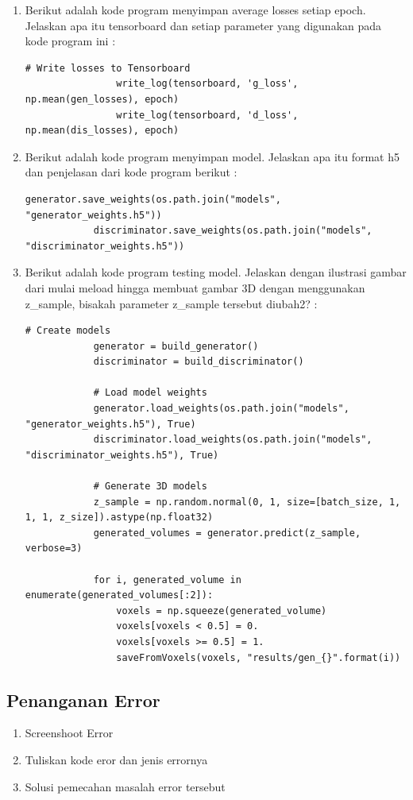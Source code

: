 \begin{enumerate}
    \item Berikut adalah kode program menyimpan average losses setiap epoch. Jelaskan apa itu tensorboard dan setiap parameter yang digunakan pada kode program ini :
    \begin{lstlisting}[caption=Simpan Average losses setiap epoch,label={lst:8.14}]
                # Write losses to Tensorboard
                write_log(tensorboard, 'g_loss', np.mean(gen_losses), epoch)
                write_log(tensorboard, 'd_loss', np.mean(dis_losses), epoch)
    \end{lstlisting}

    \item Berikut adalah kode program menyimpan model. Jelaskan apa itu format h5 dan penjelasan dari kode program berikut :
    \begin{lstlisting}[caption=Simpan model,label={lst:8.15}]
            generator.save_weights(os.path.join("models", "generator_weights.h5"))
            discriminator.save_weights(os.path.join("models", "discriminator_weights.h5"))
    \end{lstlisting}

    \item Berikut adalah kode program testing model. Jelaskan dengan ilustrasi gambar dari mulai meload hingga membuat gambar 3D dengan menggunakan z\_sample, bisakah parameter z\_sample tersebut diubah2? :
    \begin{lstlisting}[caption=Testing model,label={lst:8.16}]
            # Create models
            generator = build_generator()
            discriminator = build_discriminator()

            # Load model weights
            generator.load_weights(os.path.join("models", "generator_weights.h5"), True)
            discriminator.load_weights(os.path.join("models", "discriminator_weights.h5"), True)

            # Generate 3D models
            z_sample = np.random.normal(0, 1, size=[batch_size, 1, 1, 1, z_size]).astype(np.float32)
            generated_volumes = generator.predict(z_sample, verbose=3)

            for i, generated_volume in enumerate(generated_volumes[:2]):
                voxels = np.squeeze(generated_volume)
                voxels[voxels < 0.5] = 0.
                voxels[voxels >= 0.5] = 1.
                saveFromVoxels(voxels, "results/gen_{}".format(i))
    \end{lstlisting}
    
\end{enumerate}

\subsection{Penanganan Error}
\begin{enumerate}
	\item Screenshoot Error
	\item Tuliskan kode eror dan jenis errornya
	\item Solusi pemecahan masalah error tersebut
    
\end{enumerate}